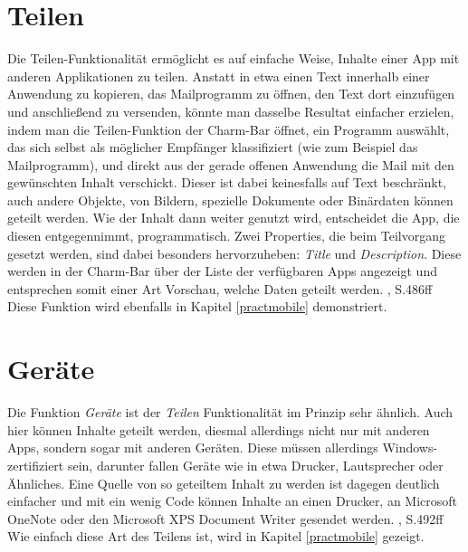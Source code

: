 \documentclass[a4paper,bibtotoc,oneside]{scrbook}
\begin{document}
\section[Teilen]{Teilen}
Die Teilen-Funktionalität ermöglicht es auf einfache Weise, Inhalte einer App mit anderen Applikationen zu teilen. Anstatt in etwa einen Text innerhalb einer Anwendung zu kopieren, das Mailprogramm zu öffnen, den Text dort einzufügen und anschließend zu versenden, könnte man dasselbe Resultat einfacher erzielen, indem man die Teilen-Funktion der Charm-Bar öffnet, ein Programm auswählt, das sich selbst als möglicher Empfänger klassifiziert (wie zum Beispiel das Mailprogramm), und direkt aus der gerade offenen Anwendung die Mail mit den gewünschten Inhalt verschickt.
\newline
\newline
Dieser ist dabei keinesfalls auf Text beschränkt, auch andere Objekte, von Bildern, spezielle Dokumente oder Binärdaten können geteilt werden. Wie der Inhalt dann weiter genutzt wird, entscheidet die App, die diesen entgegennimmt, programmatisch.
\newline
Zwei Properties, die beim Teilvorgang gesetzt werden, sind dabei besonders hervorzuheben: \textit{Title} und \textit{Description}. Diese werden in der Charm-Bar über der Liste der verfügbaren Apps angezeigt und entsprechen somit einer Art Vorschau, welche Daten geteilt werden. \cite {ana12}, S.486ff
\newline
Diese Funktion wird ebenfalls in Kapitel \ref{practmobile} demonstriert.

\section[Geräte]{Geräte}
Die Funktion \textit{Geräte} ist der \textit{Teilen} Funktionalität im Prinzip sehr ähnlich. Auch hier können Inhalte geteilt werden, diesmal allerdings nicht nur mit anderen Apps, sondern sogar mit anderen Geräten. Diese müssen allerdings Windows-zertifiziert sein, darunter fallen Geräte wie in etwa Drucker, Lautsprecher oder Ähnliches. Eine Quelle von so geteiltem Inhalt zu werden ist dagegen deutlich einfacher und mit ein wenig Code können Inhalte an einen Drucker, an Microsoft OneNote oder den Microsoft XPS Document Writer gesendet werden. \cite {ana12}, S.492ff
\newline
\newline
Wie einfach diese Art des Teilens ist, wird in Kapitel \ref{practmobile} gezeigt.
\end{document}
